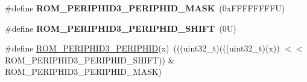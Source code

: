 \begin{DoxyCompactItemize}
\mbox{\label{group___m_t_b___register___masks_ga0f7212db2daf16bb9cd76004eef1f845}} 
\#define {\bfseries R\+O\+M\+\_\+\+P\+E\+R\+I\+P\+H\+I\+D3\+\_\+\+P\+E\+R\+I\+P\+H\+I\+D\+\_\+\+M\+A\+SK}~(0x\+F\+F\+F\+F\+F\+F\+F\+F\+U)
\item 
\mbox{\label{group___m_t_b___register___masks_ga61106adc7eb36f078c312d6111da5941}} 
\#define {\bfseries R\+O\+M\+\_\+\+P\+E\+R\+I\+P\+H\+I\+D3\+\_\+\+P\+E\+R\+I\+P\+H\+I\+D\+\_\+\+S\+H\+I\+FT}~(0\+U)
\item 
\#define \mbox{\hyperlink{group___m_t_b___register___masks_gaa9d92ba0e5acb77de8834d3c921ae4e3}{R\+O\+M\+\_\+\+P\+E\+R\+I\+P\+H\+I\+D3\+\_\+\+P\+E\+R\+I\+P\+H\+ID}}(x)~(((uint32\+\_\+t)(((uint32\+\_\+t)(x)) $<$$<$ R\+O\+M\+\_\+\+P\+E\+R\+I\+P\+H\+I\+D3\+\_\+\+P\+E\+R\+I\+P\+H\+I\+D\+\_\+\+S\+H\+I\+FT)) \& R\+O\+M\+\_\+\+P\+E\+R\+I\+P\+H\+I\+D3\+\_\+\+P\+E\+R\+I\+P\+H\+I\+D\+\_\+\+M\+A\+SK)
\end{DoxyCompactItemize}

